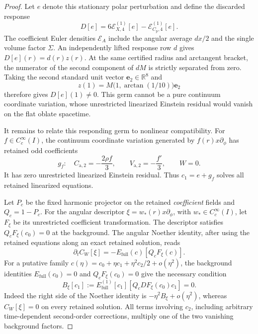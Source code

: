 \begin{proof}
Let $e$ denote this stationary polar perturbation and define the discarded response
\begin{equation}\label{eq:oblate_discarded_response}
 D[e]=6\mathscr E^{(1)}_{X,4}[e]-\mathscr E^{(1)}_{C_{\mathrm p},4}[e].
\end{equation}
The coefficient Euler densities $\mathscr E_A$ include the angular average $dx/2$ and the single volume factor $\Sigma$. An independently lifted response row $d$ gives $D[e](r)=d(r)z(r)$. At the same certified radius and arctangent bracket, the numerator of the second component of $dM$ is strictly separated from zero. Taking the second standard unit vector $\mathbf e_2\in\mathbb R^8$ and
\begin{equation}
 z(1)=M\bigl(1,\arctan(1/10)\bigr)\mathbf e_2
\end{equation}
therefore gives $D[e](1)\ne0$. This germ cannot be a pure continuum coordinate variation, whose unrestricted linearized Einstein residual would vanish on the flat oblate spacetime.

It remains to relate this responding germ to nonlinear compatibility. For $f\in C_c^\infty(I)$, the continuum coordinate variation generated by $f(r)x\partial_\phi$ has retained odd coefficients
\begin{equation}
 g_f:\quad C_{\mathrm a,2}=-\frac{2\rho f}{3},\qquad
 V_{\mathrm a,2}=-\frac{f'}3,\qquad W=0.
\end{equation}
It has zero unrestricted linearized Einstein residual. Thus $c_1=e+g_f$ solves all retained linearized equations.

Let $P_c$ be the fixed harmonic projector on the retained \emph{coefficient} fields and $Q_c=1-P_c$. For the angular descriptor $\xi=w_*(r)x\partial_\phi$, with $w_*\in C_c^\infty(I)$, let $F_\xi$ be its unrestricted coefficient transformation. The descriptor satisfies $Q_cF_\xi(c_0)=0$ at the background. The angular Noether identity, after using the retained equations along an exact retained solution, reads
\begin{equation}
 \partial_t C_W[\xi]=-E_{\mathrm{full}}(c)[Q_cF_\xi(c)].
\end{equation}
For a putative family $c(\eta)=c_0+\eta c_1+\eta^2c_2/2+o(\eta^2)$, the background identities $E_{\mathrm{full}}(c_0)=0$ and $Q_cF_\xi(c_0)=0$ give the necessary condition
\begin{equation}\label{eq:oblate_quadratic_compatibility}
 B_\xi[c_1]:=E_{\mathrm{full}}^{(1)}[c_1]
       [Q_cDF_\xi(c_0)c_1]=0.
\end{equation}
Indeed the right side of the Noether identity is $-\eta^2B_\xi+o(\eta^2)$, whereas $C_W[\xi]=0$ on every retained solution. All terms involving $c_2$, including arbitrary time-dependent second-order corrections, multiply one of the two vanishing background factors.


\end{proof}

